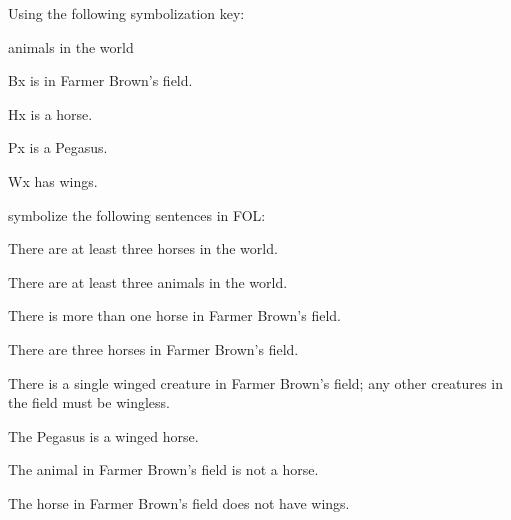 \problempart Using the following symbolization key:
\begin{ekey}
\item[\text{domain}] animals in the world
\item[Bx]  is in Farmer Brown's field.
\item[Hx]  is a horse.
\item[Px]  is a Pegasus.
\item[Wx]  has wings.
\end{ekey}
symbolize the following sentences in FOL:
\begin{earg}
\item There are at least three horses in the world.
\item[] 
\item There are at least three animals in the world.
\item[] 
\item There is more than one horse in Farmer Brown's field.
\item[] 
\item There are three horses in Farmer Brown's field.
\item[] 
\item There is a single winged creature in Farmer Brown's field; any other creatures in the field must be wingless.
\item[] 
\item The Pegasus is a winged horse.
\item[] 
\item The animal in Farmer Brown's field is not a horse.
\item[] 
\item The horse in Farmer Brown's field does not have wings.
\item[] 

\end{earg}

